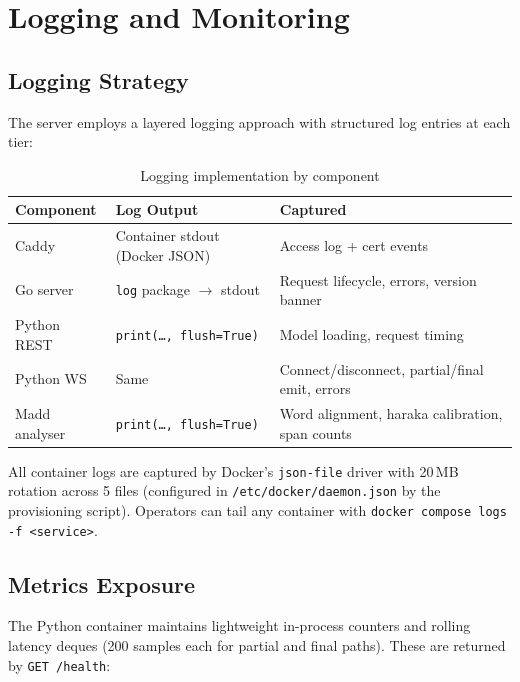 \chapter{Logging and Monitoring}

\section{Logging Strategy}

The server employs a layered logging approach with structured log entries at each tier:

\begin{table}[H]
  \centering
  \caption{Logging implementation by component}
  \label{tab:logging}
  \renewcommand{\arraystretch}{1.3}
  \begin{tabular}{lp{5.5cm}p{5cm}}
    \toprule
    \textbf{Component} & \textbf{Log Output} & \textbf{Captured} \\
    \midrule
    Caddy           & Container stdout (Docker JSON)  & Access log + cert events \\
    Go server       & \texttt{log} package $\rightarrow$ stdout & Request lifecycle, errors, version banner \\
    Python REST     & \texttt{print(\dots, flush=True)}        & Model loading, request timing \\
    Python WS       & Same                                     & Connect/disconnect, partial/final emit, errors \\
    Madd analyser   & \texttt{print(\dots, flush=True)}        & Word alignment, haraka calibration, span counts \\
    \bottomrule
  \end{tabular}
\end{table}

All container logs are captured by Docker's \texttt{json-file} driver with 20\,MB rotation across 5 files (configured in \texttt{/etc/docker/daemon.json} by the provisioning script). Operators can tail any container with \texttt{docker compose logs -f <service>}.

\section{Metrics Exposure}

The Python container maintains lightweight in-process counters and rolling latency deques (200 samples each for partial and final paths). These are returned by \texttt{GET /health}:

